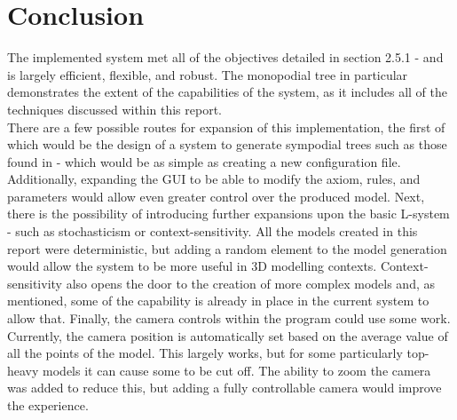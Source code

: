 \documentclass[12pt]{article}
\begin{document}
\section{Conclusion}
The implemented system met all of the objectives detailed in section 2.5.1 - and is largely efficient, flexible, and robust. The monopodial tree in particular demonstrates the extent of the capabilities of the system, as it includes all of the techniques discussed within this report.\\
There are a few possible routes for expansion of this implementation, the first of which would be the design of a system to generate sympodial trees such as those found in \cite{abop} - which would be as simple as creating a new configuration file. Additionally, expanding the GUI to be able to modify the axiom, rules, and parameters would allow even greater control over the produced model. Next, there is the possibility of introducing further expansions upon the basic L-system - such as stochasticism or context-sensitivity. All the models created in this report were deterministic, but adding a random element to the model generation would allow the system to be more useful in 3D modelling contexts. Context-sensitivity also opens the door to the creation of more complex models and, as mentioned, some of the capability is already in place in the current system to allow that. Finally, the camera controls within the program could use some work. Currently, the camera position is automatically set based on the average value of all the points of the model. This largely works, but for some particularly top-heavy models it can cause some to be cut off. The ability to zoom the camera was added to reduce this, but adding a fully controllable camera would improve the experience.

\printbibliography
\end{document}
